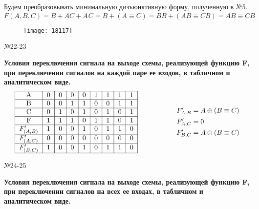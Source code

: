 \documentclass[]{article}
\begin{document}
	Будем преобразовывать минимальную дизъюнктивную форму, полученную в №5.
	\[
	F(A,B,C)=\overline{B} + AC + \overline{A}\hspace{1pt}\overline{C}=
	\overline{B}+(A\equiv C)=\overline{B}B+(AB\equiv CB)=AB\equiv CB
	\]
	\begin{figure}[h!]
		\centering
		\texttt{[image: 18117]}
	\end{figure}	
	\newpage
	\begin{center}\begin{large}{№22-23}\end{large}\end{center}
	\textbf{Условия переключения сигнала на выходе схемы, реализующей функцию F, при переключении сигналов на каждой паре ее входов, в табличном и аналитическом виде.}
	\[
	\begin{aligned}
	\begin{tabular}{|c|c|c|c|c|c|c|c|c|}
	\hline
	A              & 0 & 0 & 0 & 0 & 1 & 1 & 1 & 1 \\ \hline
	B              & 0 & 0 & 1 & 1 & 0 & 0 & 1 & 1 \\ \hline
	C              & 0 & 1 & 0 & 1 & 0 & 1 & 0 & 1 \\ \hline
	F              & 1 & 1 & 1 & 0 & 1 & 1 & 0 & 1 \\ \hline
	$F'_{(A,B)}$   & 1 & 0 & 0 & 1 & 0 & 1 & 1 & 0 \\ \hline
	$F'_{(A,C)}$   & 0 & 0 & 0 & 0 & 0 & 0 & 0 & 0 \\ \hline
	$F'_{(B,C)}$   & 1 & 0 & 0 & 1 & 0 & 1 & 1 & 0 \\ \hline
	\end{tabular}
	\begin{aligned}
	\hspace{2cm}
	F'_{A,B}&=A\oplus(B\equiv C)\\
	F'_{A,C}&=0\\
	F'_{B,C}&=A\oplus(B\equiv C)\\
	\end{aligned}
	\end{aligned}
	\]
	\begin{center}\begin{large}{№24-25}\end{large}\end{center}
	\textbf{Условия переключения сигнала на выходе схемы, реализующей функцию F, при переключении сигналов на всех ее входах, в табличном и аналитическом виде.}
\end{document}
